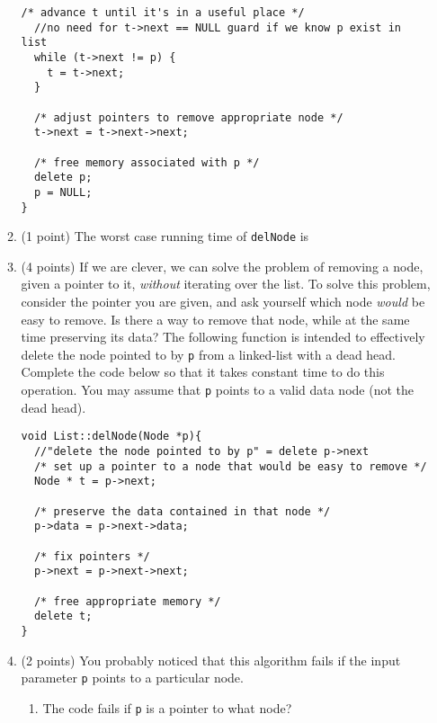 \documentclass[11pt,table]{article}
\newcommand{\fillinMC}[1]{\fillinMCmath{\mbox{#1}}}
\newcommand{\fillinMCmath}[1]{\begin{tikzpicture}\draw circle [radius=0.35em];\end{tikzpicture}\ #1}
\newcommand{\filledMC}[1]{\filledMCmath{\mbox{#1}}}
\newcommand{\filledMCmath}[1]{\begin{tikzpicture}\draw[fill=black] circle [radius=0.35em];\end{tikzpicture}\ #1}
\begin{document}
\begin{enumerate}
\begin{enumerate}[resume]
\begin{Verbatim}[frame=single,framerule=2pt]
  /* advance t until it's in a useful place */
  //no need for t->next == NULL guard if we know p exist in list
  while (t->next != p) {
    t = t->next;
  }
  
  /* adjust pointers to remove appropriate node */
  t->next = t->next->next;
  
  /* free memory associated with p */
  delete p;
  p = NULL;
}
\end{Verbatim}

\item (1 point) The worst case running time of \texttt{delNode} is 

\item (4 points)
If we are clever, we can solve the problem of removing a node, given a pointer to it, \emph{without} iterating over the list. To solve this problem, consider the pointer you are given, and ask yourself which node \emph{would} be easy to remove. Is there a way to remove that
node, while at the same time preserving its data? 
The following function is intended to effectively delete the node pointed to by \texttt{p} from a linked-list with a dead head.
Complete the code below so that it takes constant time to do this operation.
You may assume that \texttt{p} points to a valid data node (not the dead head). 

\begin{Verbatim}[frame=single,framerule=2pt]
void List::delNode(Node *p){
  //"delete the node pointed to by p" = delete p->next
  /* set up a pointer to a node that would be easy to remove */
  Node * t = p->next;

  /* preserve the data contained in that node */
  p->data = p->next->data;

  /* fix pointers */
  p->next = p->next->next;
  
  /* free appropriate memory */
  delete t;
}
\end{Verbatim}

\item (2 points) You probably noticed that this algorithm fails if the input parameter \texttt{p} points to a particular node. 
\begin{enumerate}
    \item The code fails if \texttt{p} is a pointer to what node?


\end{enumerate}
\end{enumerate}
\end{enumerate}
\end{document}
